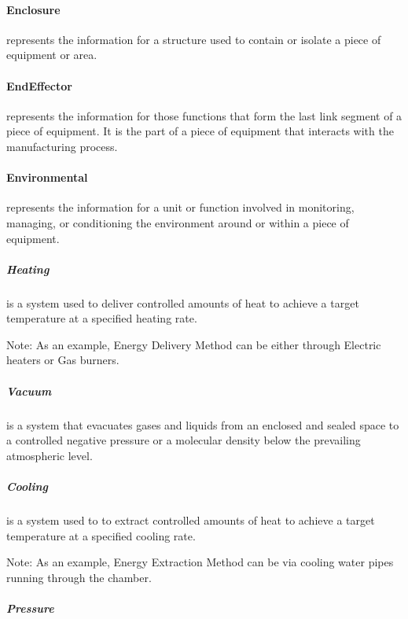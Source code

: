 \paragraph{Enclosure}\mbox{}
\label{sec:Enclosure}


 represents the information for a structure used to contain or isolate a piece of equipment or area.


\paragraph{EndEffector}\mbox{}
\label{sec:EndEffector}


 represents the information for those functions that form the last link segment of a piece of equipment. It is the part of a piece of equipment that interacts with the manufacturing process.


\paragraph{Environmental}\mbox{}
\label{sec:Environmental}


 represents the information for a unit or function involved in monitoring, managing, or conditioning the environment around or within a piece of equipment.


\subparagraph{Heating}\mbox{}
\label{sec:Heating}


 is a system used to deliver controlled amounts of heat to achieve a target temperature at a specified heating rate.

Note: As an example, Energy Delivery Method can be either through Electric heaters or Gas burners.


\subparagraph{Vacuum}\mbox{}
\label{sec:Vacuum}


 is a system that evacuates gases and liquids from an enclosed and sealed space to a controlled negative pressure or a molecular density below the prevailing atmospheric level.


\subparagraph{Cooling}\mbox{}
\label{sec:Cooling}


 is a system used to to extract controlled amounts of heat to achieve a target temperature at a specified cooling rate.

Note: As an example, Energy Extraction Method can be via cooling water pipes running through the chamber.


\subparagraph{Pressure}\mbox{}
\label{sec:Pressure}


